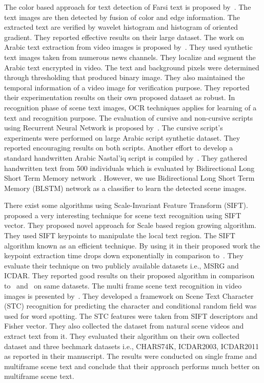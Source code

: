 \documentclass[conference]{IEEEtran}
\begin{document}
The color based approach for text detection of Farsi text is proposed by~\cite{ah}.
The text images are then detected by fusion of color and edge information. The extracted text are verified by wavelet histogram and histogram of oriented gradient. They reported effective results on their large dataset.
The work on Arabic text extraction from video images is proposed by~\cite{at}.
They used synthetic text images taken from numerous news channels.
They localize and segment the Arabic text encrypted in video. The text and background pixels were determined through thresholding that produced binary image. They also maintained the temporal information of a video image for verification purpose. They reported their experimentation results on their own proposed dataset as robust.
In recognition phase of scene text images, OCR techniques applies for learning of a text and recognition purpose. The evaluation of cursive and non-cursive scripts using Recurrent Neural Network is proposed by~\cite{ec}. The cursive script's experiments were performed on large Arabic script synthetic dataset. They reported encouraging results on both scripts. Another effort to develop a standard handwritten Arabic Nastal'iq script is compiled by~\cite{ucom}.
They gathered handwritten text from 500 individuals which is evaluated by Bidirectional Long Short Term Memory network~\cite{hu}. However, we use Bidirectional Long Short Term  Memory (BLSTM) network as a classifier to learn the detected scene images.

There exist some algorithms using Scale-Invariant Feature Transform (SIFT).~\cite{sift} proposed a very interesting technique for scene text recognition using SIFT vector. They proposed novel approach for Scale based region growing algorithm.  They used SIFT keypoints to manipulate the local text region. The SIFT algorithm known as an efficient technique. By using it in their proposed work the keypoint  extraction time drops down exponentially in comparison to~\cite{at}. They evaluate their technique on two publicly available datasets i.e., MSRG and ICDAR. They reported good results on their proposed algorithm in comparison to~\cite{cvpr} and~\cite{icip} on same datasets.
The multi frame scene text recognition in video images is presented by~\cite{icme}.
They developed a framework on Scene Text Character (STC) recognition for predicting the character and conditional random field was used for word spotting. The STC features were taken from SIFT descriptors and Fisher vector.
They also collected the dataset from natural scene videos and extract text from it. They evaluated their algorithm on their own collected dataset and three bechmark datasets i.e., CHARS74K, ICDAR2003, ICDAR2011 as reported in their manuscript. The results were conducted on single frame and multiframe scene text and conclude that their approach performs much better on multiframe scene text.
\end{document}
